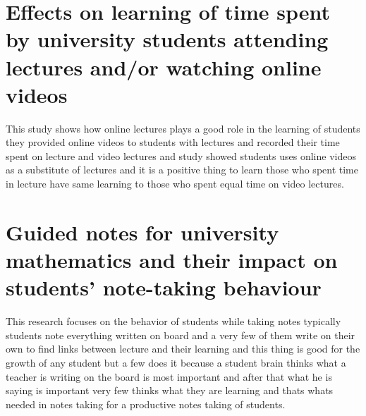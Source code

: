\documentclass[12pt]{article}
\begin{document}
\section{Effects on learning of time spent by university students attending lectures and/or watching online videos}
This study shows how online lectures plays a good role in the learning of students they provided online videos to students with lectures and recorded their time spent on lecture and video lectures and study showed students uses online videos as a substitute of lectures and it is a positive thing to learn those who spent time in lecture have same learning to those who spent equal time on video lectures.


\section{Guided notes for university mathematics and their impact on students’ note-taking behaviour}
This research focuses on the behavior of students while taking notes typically students note everything written on board and a very few of them write on their own to find links between lecture and their learning and this thing is good for the growth of any student but a few does it because a student brain thinks what a teacher is writing on the board is most important and after that what he is saying is important very few thinks what they are learning and thats whats needed in notes taking for a productive notes taking of students.
\end{document}
